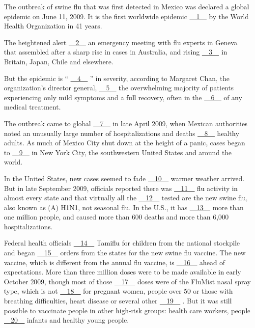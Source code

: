 The outbreak of swine flu that was first detected in Mexico was declared a global epidemic on June 11, 2009. It is the first worldwide epidemic \uline{~~1~~} by the World Health Organization in 41 years.


The heightened alert \uline{~~2~~} an emergency meeting with flu experts in Geneva that assembled after a sharp rise in cases in Australia, and rising \uline{~~3~~} in Britain, Japan, Chile and elsewhere.


But the epidemic is `` \uline{~~4~~} '' in severity, according to Margaret Chan, the organization's director general, \uline{~~5~~} the overwhelming majority of patients experiencing only mild symptoms and a full recovery, often in the \uline{~~6~~} of any medical treatment.


The outbreak came to global \uline{~~7~~} in late April 2009, when Mexican authorities noted an unusually large number of hospitalizations and deaths \uline{~~8~~} healthy adults. As much of Mexico City shut down at the height of a panic, cases began to \uline{~~9~~} in New York City, the southwestern United States and around the world.


In the United States, new cases seemed to fade \uline{~~10~~} warmer weather arrived. But in late September 2009, officials reported there was \uline{~~11~~} flu activity in almost every state and that virtually all the \uline{~~12~~} tested are the new swine flu, also known as (A) H1N1, not seasonal flu. In the U.S., it has \uline{~~13~~} more than one million people, and caused more than 600 deaths and more than 6,000 hospitalizations.


Federal health officials \uline{~~14~~} Tamiflu for children from the national stockpile and began \uline{~~15~~} orders from the states for the new swine flu vaccine. The new vaccine, which is different from the annual flu vaccine, is \uline{~~16~~} ahead of expectations. More than three million doses were to be made available in early October 2009, though most of those \uline{~~17~~} doses were of the FluMist nasal spray type, which is not \uline{~~18~~} for pregnant women, people over 50 or those with breathing difficulties, heart disease or several other \uline{~~19~~} . But it was still possible to vaccinate people in other high-risk groups: health care workers, people \uline{~~20~~} infants and healthy young people.